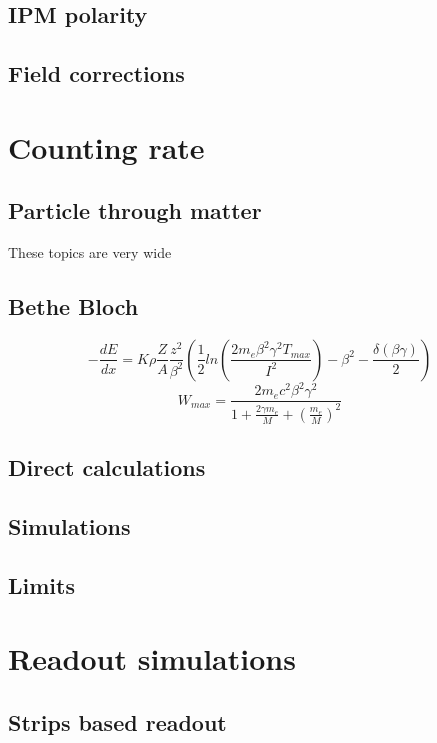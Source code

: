 \begin{refsection}
	\subsection{IPM polarity}
	\subsection{Field corrections}

	\section{Counting rate}
  \subsection{Particle through matter}

  These topics are very wide 
  \subsection{Bethe Bloch}
  \begin{equation}
    -\frac{dE}{dx}=K \rho \frac{Z}{A} \frac{z^{2}}{\beta^{2}} \left(\frac{1}{2} ln \left(\frac{2 m_{e} \beta^{2} \gamma^{2} T_{max}}{I^{2}} \right) - \beta^{2} - \frac{\delta(\beta \gamma)}{2} \right)
  \end{equation}
  \begin{equation}
    W_{max} = \frac{2 m_{e} c^{2} \beta^{2} \gamma^{2}}{1 + \frac{2 \gamma m_{e} }{M} + \left( \frac{m_{e}}{M} \right)^{2}}
  \end{equation}
  \subsection{Direct calculations}
  
	\subsection{Simulations}
	\subsection{Limits}

	\section{Readout simulations}
	\subsection{Strips based readout}

\end{refsection}
